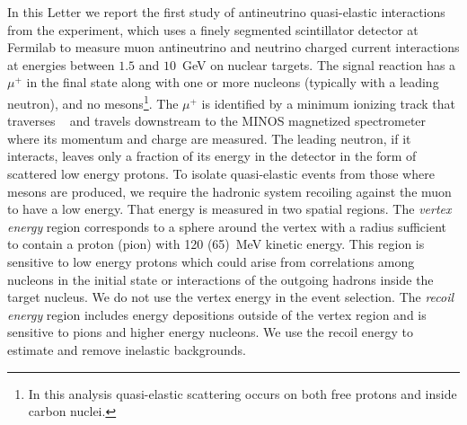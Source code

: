 In this Letter we report the first study of antineutrino quasi-elastic interactions from the \minerva experiment, which uses a finely segmented scintillator detector at Fermilab to measure muon antineutrino and neutrino charged current interactions at energies between $1.5$ and $10$~GeV on nuclear targets.  
The signal reaction has a $\mu^+$ in the final state along with one or more nucleons (typically with a leading neutron), and no mesons\footnote{{I}n this analysis quasi-elastic scattering occurs on both free protons and inside carbon nuclei.}. 
The $\mu^+$ is identified by a minimum ionizing track that traverses  \minerva~\cite{minerva_nim} and travels downstream to the MINOS magnetized spectrometer~\cite{Michael:2008bc} where its momentum and charge are measured. 
The leading neutron, if it interacts, leaves only a fraction of its energy in the detector in the form of scattered low energy protons.  
To isolate quasi-elastic events from those where mesons are produced, we require the hadronic system recoiling against the muon to have a low energy. That energy is measured in two spatial regions. The {\it vertex energy} region corresponds to a sphere around the vertex with a radius sufficient to contain a proton (pion) with 120 (65)~MeV kinetic energy. This region is sensitive to low energy protons which could arise from correlations among nucleons in the initial state or interactions of the outgoing hadrons inside the target nucleus. We do not use the vertex energy in the event selection.  The {\it recoil energy} region includes energy depositions outside of the vertex region and is sensitive to pions and higher energy nucleons. We use the recoil energy to estimate and remove inelastic backgrounds.




